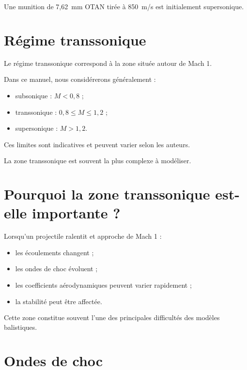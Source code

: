\begin{exemple}

Une munition de 7,62~mm OTAN tirée à 850~m/s est initialement supersonique.

\end{exemple}

\section{Régime transsonique}

Le régime transsonique correspond à la zone située autour de Mach 1.

Dans ce manuel, nous considérerons généralement :

\begin{itemize}
\item subsonique : $M < 0,8$ ;
\item transsonique : $0,8 \leq M \leq 1,2$ ;
\item supersonique : $M > 1,2$.
\end{itemize}

Ces limites sont indicatives et peuvent varier selon les auteurs.

\begin{aretenir}

La zone transsonique est souvent la plus complexe à modéliser.

\end{aretenir}

\section{Pourquoi la zone transsonique est-elle importante ?}

Lorsqu'un projectile ralentit et approche de Mach 1 :

\begin{itemize}
\item les écoulements changent ;
\item les ondes de choc évoluent ;
\item les coefficients aérodynamiques peuvent varier rapidement ;
\item la stabilité peut être affectée.
\end{itemize}

Cette zone constitue souvent l'une des principales difficultés des modèles
balistiques.

\section{Ondes de choc}

